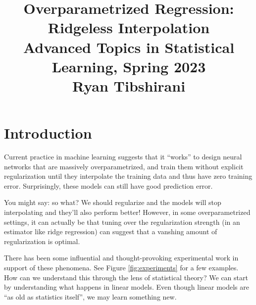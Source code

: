 \documentclass{article}
\title{Overparametrized Regression: Ridgeless Interpolation \\ \smallskip
\large Advanced Topics in Statistical Learning, Spring 2023 \\ \smallskip
Ryan Tibshirani }
\date{}
\begin{document}
\maketitle
\RaggedRight
\vspace{-50pt}

\section{Introduction}

Current practice in machine learning suggests that it ``works'' to design neural
networks that are massively overparametrized, and train them without explicit
regularization until they interpolate the training data and thus have zero
training error. Surprisingly, these models can still have good prediction error.     

You might say: so what? We should regularize and the models will stop
interpolating and they'll also perform better! However, in some overparametrized  
settings, it can actually be that tuning over the regularization strength (in an 
estimator like ridge regression) can suggest that a vanshing amount of
regularization is optimal. 

There has been some influential and thought-provoking experimental work in
support of these phenomena. See Figure \ref{fig:experiments} for a few
examples. How can we understand this through the lens of statistical theory?
We can start by understanding what happens in linear models. Even though linear
models are ``as old as statistics itself'', we may learn something new.    
\end{document}
